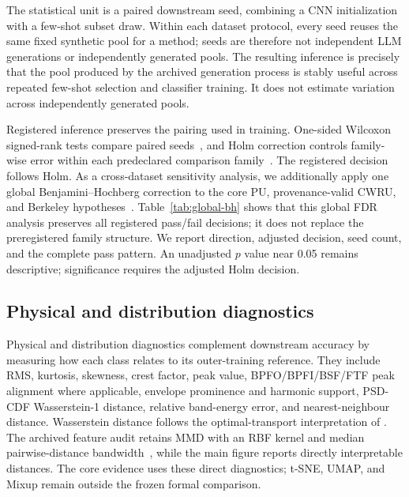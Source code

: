 \documentclass[a4paper,fleqn]{cas-sc}
\begin{document}
The statistical unit is a paired downstream seed, combining a CNN
initialization with a few-shot subset draw. Within each dataset protocol, every
seed reuses the same fixed synthetic pool for a method; seeds are therefore not
independent LLM generations or independently generated pools. The resulting
inference is precisely that the pool produced by the archived generation
process is stably useful across repeated few-shot selection and classifier
training. It does not estimate variation across independently generated pools.

Registered inference preserves the pairing used in training. One-sided
Wilcoxon signed-rank tests compare paired seeds~\citep{wilcoxon1945paired}, and
Holm correction controls family-wise error within each predeclared comparison
family~\citep{holm1979multiple}. The registered decision follows Holm. As a
cross-dataset sensitivity analysis, we additionally apply one global
Benjamini--Hochberg correction to the \BreezeGlobalCoreHypotheses{} core PU,
provenance-valid CWRU, and
Berkeley hypotheses~\citep{benjamini1995fdr}. Table~\ref{tab:global-bh} shows
that this global FDR analysis preserves all
\BreezeGlobalDecisionAgreement{} registered pass/fail decisions;
it does not replace the preregistered family structure. We report direction,
adjusted decision, seed count, and the complete pass pattern. An unadjusted
$p$ value near 0.05 remains descriptive; significance requires the adjusted
Holm decision.



\subsection{Physical and distribution diagnostics}

Physical and distribution diagnostics complement downstream accuracy by
measuring how each class relates to its outer-training reference. They include
RMS, kurtosis, skewness, crest factor, peak value, BPFO/BPFI/BSF/FTF peak
alignment where applicable, envelope prominence and harmonic support, PSD-CDF
Wasserstein-1 distance, relative band-energy error, and nearest-neighbour
distance. Wasserstein distance follows the optimal-transport interpretation of
\citet{villani2009transport}. The archived feature audit retains MMD with an RBF
kernel and median pairwise-distance bandwidth~\citep{gretton2012mmd}, while the
main figure reports directly interpretable distances. The core evidence uses
these direct diagnostics; t-SNE, UMAP, and Mixup remain outside the frozen
formal comparison.
\end{document}

